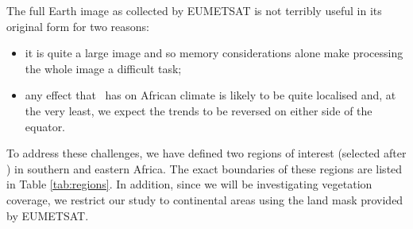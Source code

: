 \begin{table}
  \centering
  \caption{The coordinates that define our regions of interest. Top
    (Left) and Bottom (Right) correspond to the most northern
    (eastern) and southern (western) latitudes (longitudes) of the
    boxes defining the regions, respectively. All values in decimal
    degrees.}
  \label{tab:regions}
\end{table}

The full Earth image as collected by EUMETSAT is not terribly useful
in its original form for two reasons:
\begin{itemize}
  \item{it is quite a large
    image and so memory considerations alone make processing the whole
    image a difficult task;}
  \item{any effect that \elnino\ has on African climate is likely to be
    quite localised and, at the very least, we expect the trends to be
    reversed on either side of the equator.}
\end{itemize}
To address these challenges, we have defined two regions of interest
(selected after \cite{anyamba1996, anyamba2002}) in southern and
eastern Africa. The exact boundaries of these regions are listed in
Table \ref{tab:regions}. In addition, since we will be investigating
vegetation coverage, we restrict our study to continental areas using
the land mask provided by EUMETSAT.

